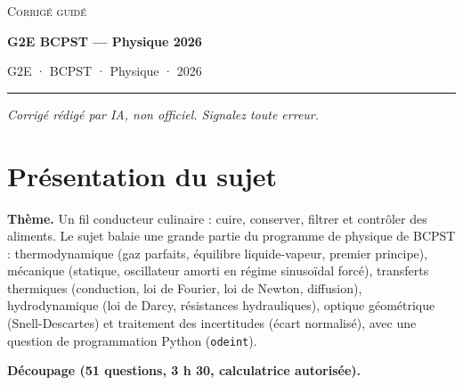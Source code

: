 \documentclass[11pt,a4paper]{article}
\begin{document}
\thispagestyle{plain}
\begin{center}
  {\small\scshape Corrigé guidé}\par\smallskip
  {\LARGE\bfseries G2E BCPST — Physique 2026\par}\medskip
  {\large G2E · BCPST · Physique · 2026\par}
\end{center}
\vspace{2pt}\hrule\vspace{8pt}

\emph{Corrigé rédigé par IA, non officiel. Signalez toute erreur.}

\hypertarget{pruxe9sentation-du-sujet}{%
\section{Présentation du sujet}\label{pruxe9sentation-du-sujet}}

\textbf{Thème.} Un fil conducteur culinaire : cuire, conserver, filtrer et contrôler des aliments. Le sujet balaie une grande partie du programme de physique de BCPST : thermodynamique (gaz parfaits, équilibre liquide-vapeur, premier principe), mécanique (statique, oscillateur amorti en régime sinusoïdal forcé), transferts thermiques (conduction, loi de Fourier, loi de Newton, diffusion), hydrodynamique (loi de Darcy, résistances hydrauliques), optique géométrique (Snell-Descartes) et traitement des incertitudes (écart normalisé), avec une question de programmation Python (\texttt{odeint}).

\textbf{Découpage (51 questions, 3 h 30, calculatrice autorisée).}
\end{document}
